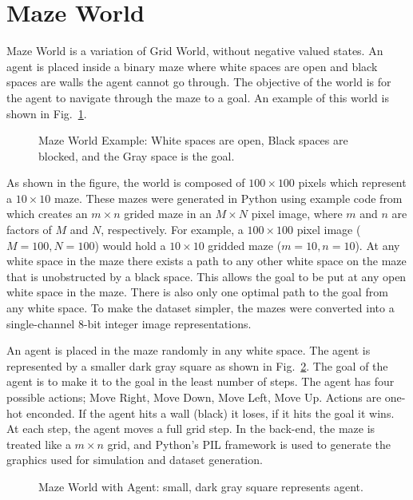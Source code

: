 \documentclass[12pt,american]{report}
\begin{document}
\section{Maze World}
\label{sec:dataset}
Maze World is a variation of Grid World, without negative valued states.  An agent is placed inside a binary maze where white spaces are open and black spaces are walls the agent cannot go through.  The objective of the world is for the agent to navigate through the maze to a goal.  An example of this world is shown in Fig.~\ref{fig:maze_world_example}.
\begin{figure}
\centering
\setlength{\fboxsep}{0pt}%
\caption{Maze World Example: White spaces are open, Black spaces are blocked, and the Gray space is the goal.}
\label{fig:maze_world_example}
\end{figure}
As shown in the figure, the world is composed of $100\times 100$ pixels which represent a $10\times 10$ maze.  These mazes were generated in Python using example code from~\cite{maze_code} which creates an $m\times n$ grided maze in an $M\times N$ pixel image, where $m$ and $n$ are factors of $M$ and $N$, respectively. For example, a $100 \times 100$ pixel image ($M=100, N=100$) would hold a $10 \times 10$ gridded maze ($m=10, n=10$). At any white space in the maze there exists a path to any other white space on the maze that is unobstructed by a black space.  This allows the goal to be put at any open white space in the maze.  There is also only one optimal path to the goal from any white space. To make the dataset simpler, the mazes were converted into a single-channel 8-bit integer image representations.  

An agent is placed in the maze randomly in any white space.  The agent is represented by a smaller dark gray square as shown in Fig.~\ref{fig:maze_with_agent}. The goal of the agent is to make it to the goal in the least number of steps.  The agent has four possible actions; Move Right, Move Down, Move Left, Move Up. Actions are one-hot enconded. If the agent hits a wall (black) it loses, if it hits the goal it wins. At each step, the agent moves a full grid step.  In the back-end, the maze is treated like a $m\times n$ grid, and Python's PIL framework is used to generate the graphics used for simulation and dataset generation.
\begin{figure}
\centering
\setlength{\fboxsep}{0pt}%
\caption{Maze World with Agent: small, dark gray square represents agent.}
\label{fig:maze_with_agent}
\end{figure}
\end{document}
